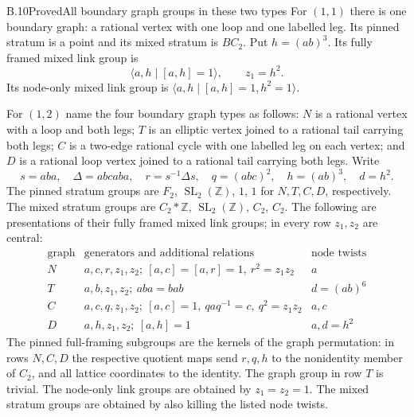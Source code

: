 \begin{result}{B.10}{Proved}{All boundary graph groups in these two types}
For $(1,1)$ there is one boundary graph: a rational vertex with one
loop and one labelled leg.  Its pinned stratum is a point and its
mixed stratum is $BC_2$.  Put $h=(ab)^3$.  Its fully framed mixed
link group is
\[
 \langle a,h\mid[a,h]=1\rangle,\qquad z_1=h^2.
 \tag{B.12}
\]
Its node-only mixed link group is
$\langle a,h\mid[a,h]=1,h^2=1\rangle$.

For $(1,2)$ name the four boundary graph types as follows:
$N$ is a rational vertex with a loop and both legs;
$T$ is an elliptic vertex joined to a rational tail carrying both
legs; $C$ is a two-edge rational cycle with one labelled leg on
each vertex; and $D$ is a rational loop vertex joined to a rational
tail carrying both legs.  Write
\[
 s=aba,\quad\Delta=abcaba,\quad
 r=s^{-1}\Delta s,\quad q=(abc)^2,\quad h=(ab)^3,
 \quad d=h^2.
 \tag{B.13}
\]
The pinned stratum groups are $F_2$, $\operatorname{SL}_2(\mathbb Z)$,
$1$, $1$ for $N,T,C,D$, respectively.  The mixed stratum groups are
$C_2*\mathbb Z$, $\operatorname{SL}_2(\mathbb Z)$, $C_2$, $C_2$.
The following are presentations of their fully framed mixed link
groups; in every row $z_1,z_2$ are central:
\[
\begin{array}{c|l|l}
 \text{graph}&\text{generators and additional relations}
                   &\text{node twists}\\\hline
 N&a,c,r,z_1,z_2;\ [a,c]=[a,r]=1,\ r^2=z_1z_2&a\\
 T&a,b,z_1,z_2;\ aba=bab&d=(ab)^6\\
 C&a,c,q,z_1,z_2;\ [a,c]=1,\ qaq^{-1}=c,\ q^2=z_1z_2&a,c\\
 D&a,h,z_1,z_2;\ [a,h]=1&a,d=h^2
\end{array}
\tag{B.14}
\]
The pinned full-framing subgroups are the kernels of the graph
permutation: in rows $N,C,D$ the respective quotient maps send
$r,q,h$ to the nonidentity member of $C_2$, and all lattice
coordinates to the identity.  The graph group in row $T$ is
trivial.  The node-only link groups are obtained by $z_1=z_2=1$.
The mixed stratum groups are obtained by also killing the listed
node twists.
\end{result}
